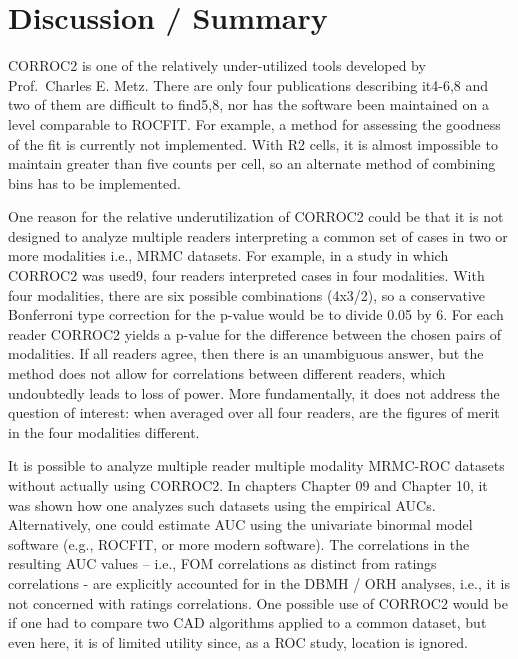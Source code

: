 \documentclass[
]{book}
\begin{document}
\hypertarget{bivariate-binormal-model-corroc2-discussion}{%
\section{Discussion / Summary}\label{bivariate-binormal-model-corroc2-discussion}}

CORROC2 is one of the relatively under-utilized tools developed by Prof.~Charles E. Metz. There are only four publications describing it4-6,8 and two of them are difficult to find5,8, nor has the software been maintained on a level comparable to ROCFIT. For example, a method for assessing the goodness of the fit is currently not implemented. With R2 cells, it is almost impossible to maintain greater than five counts per cell, so an alternate method of combining bins has to be implemented.

One reason for the relative underutilization of CORROC2 could be that it is not designed to analyze multiple readers interpreting a common set of cases in two or more modalities i.e., MRMC datasets. For example, in a study in which CORROC2 was used9, four readers interpreted cases in four modalities. With four modalities, there are six possible combinations (4x3/2), so a conservative Bonferroni type correction for the p-value would be to divide 0.05 by 6. For each reader CORROC2 yields a p-value for the difference between the chosen pairs of modalities. If all readers agree, then there is an unambiguous answer, but the method does not allow for correlations between different readers, which undoubtedly leads to loss of power. More fundamentally, it does not address the question of interest: when averaged over all four readers, are the figures of merit in the four modalities different.

It is possible to analyze multiple reader multiple modality MRMC-ROC datasets without actually using CORROC2. In chapters Chapter 09 and Chapter 10, it was shown how one analyzes such datasets using the empirical AUCs. Alternatively, one could estimate AUC using the univariate binormal model software (e.g., ROCFIT, or more modern software). The correlations in the resulting AUC values -- i.e., FOM correlations as distinct from ratings correlations - are explicitly accounted for in the DBMH / ORH analyses, i.e., it is not concerned with ratings correlations. One possible use of CORROC2 would be if one had to compare two CAD algorithms applied to a common dataset, but even here, it is of limited utility since, as a ROC study, location is ignored.
\end{document}
